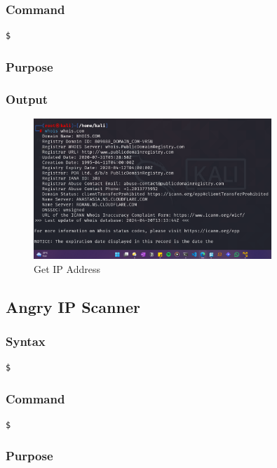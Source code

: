 \documentclass[11pt]{article}
\begin{document}
\subsubsection*{Command}
\begin{verbatim}
$
\end{verbatim}

\subsubsection*{Purpose}

\subsubsection*{Output}
\begin{figure}[H]
    \centering
    \includegraphics[width=0.8\textwidth]{whois (1).png}
    \caption{Get IP Address}
    \label{fig:1}
\end{figure}

\subsection{Angry IP Scanner}

\subsubsection*{Syntax}
\begin{verbatim}
$
\end{verbatim}

\subsubsection*{Command}
\begin{verbatim}
$
\end{verbatim}

\subsubsection*{Purpose}
\end{document}
